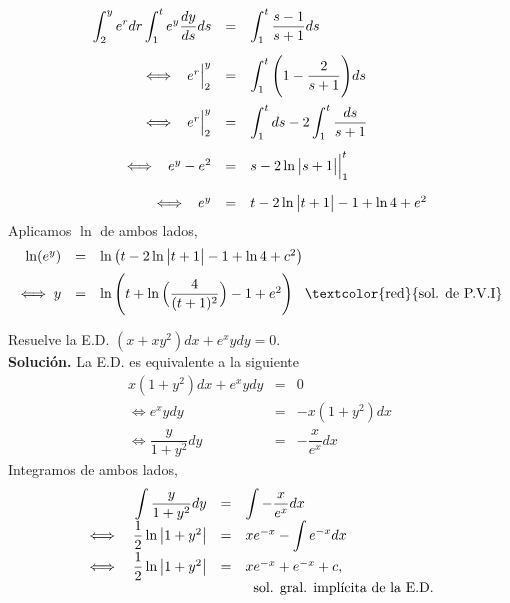 \documentclass{beamer}
\begin{document}
\begin{frame}[t]
	\vspace{-3mm}
	\begin{exampleblock}{}
		\[
			\begin{array}{rcl}
				\displaystyle\int _2^ye^rdr\displaystyle\int _1^te^y \dfrac{dy}{ds} ds & = & \displaystyle\int _1^t \dfrac{s-1}{s+1} ds \\[5mm]
				\iff \hspace{2mm} e^r \Big|_2^y & = & \displaystyle\int _1^t \Bigg(1- \dfrac{2}{s+1}\Bigg) ds\\[5mm]
				\iff \hspace{2mm} e ^r\Big|_2^y & = & \displaystyle\int _1^tds-2 \displaystyle\int _1^t \dfrac{ds}{s+1} \\[5mm]
				\iff \hspace{2mm} e^y-e^2 & = & s-2 \ln \big| s+ 1 \big| \Big| _1^t \\[5mm]
				\iff \hspace{2mm} e^y & = & t-2 \ln \big| t+1 \big| -1+ \ln 4+e^2
			\end{array}
		\]
		Aplicamos \(\ln\) de ambos lados,
		\[
			\begin{array}{rcl}
				\ln (e^y) & = & \ln \big(t-2 \ln \big| t+1 \big| -1+ \ln 4+c^2\big) \\[2mm]
				\iff y & = & \ln \Bigg(t+ \ln \Big(\dfrac{4}{(t+1) ^2} \Big)-1+e^2\Bigg) \hspace{3mm} \mbox{\textcolor{red}{sol. de P.V.I}}
			\end{array}
		\]
	\end{exampleblock}
\end{frame}

\begin{frame}[t]
	\begin{example}
		Resuelve la E.D. \((x+xy^2) dx+e^xydy =0\). \\[2mm]
		\textbf{Solución.} La E.D. es equivalente a la siguiente 
		\[
			\begin{array}{rcl}
				x(1+y^2) dx+e^xydy & = & 0 \\[2mm]
				\iff e^xydy & = & -x(1+y^2) dx \\[2mm]
				\iff \dfrac{y}{1+y^2} dy & = & - \dfrac{x}{e^x} dx
			\end{array}
		\]
		Integramos de ambos lados, \vspace{-2mm}
		\[
			\begin{array}{rrcl}
				&\displaystyle\int \dfrac{y}{1+y^2} dy & = & \displaystyle\int - \dfrac{x}{e^x} dx \\[2mm]
				\iff & \dfrac{1}{2} \ln \big| 1+y^2 \big| & = & xe^{-x} - \displaystyle\int e^{-x} dx \\[2mm]
				\iff & \dfrac{1}{2} \ln \big| 1+y^2 \big| & = & xe^{-x} +e^{-x} +c,\\
				&&&  \hspace{2mm} \mbox{sol. gral. implícita de la E.D.}
			\end{array}
		\]
	\end{example}
\end{frame}
\end{document}
